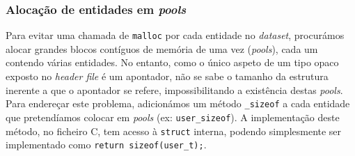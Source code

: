 \documentclass[12pt, a4paper]{article}
\begin{document}
\subsubsection{Alocação de entidades em \emph{pools}}

Para evitar uma chamada de \texttt{malloc} por cada entidade no \emph{dataset}, procurámos alocar
grandes blocos contíguos de memória de uma vez (\emph{pools}), cada um contendo várias entidades.
No entanto, como o único aspeto de um tipo opaco exposto no \emph{header file} é um apontador, não
se sabe o tamanho da estrutura inerente a que o apontador se refere, impossibilitando a existência
destas \emph{pools}. Para endereçar este problema, adicionámos um método \texttt{\_sizeof} a cada
entidade que pretendíamos colocar em \emph{pools} (ex: \texttt{user\_sizeof}). A implementação
deste método, no ficheiro C, tem acesso à \texttt{struct} interna, podendo simplesmente ser
implementado como \texttt{return sizeof(user\_t);}.
\end{document}
